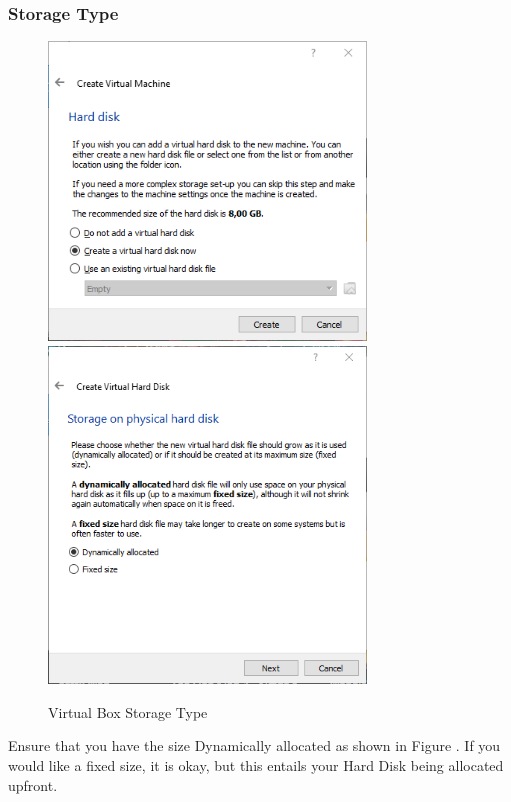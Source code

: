 \subsubsection{Storage Type}
\begin{figure}[!htb]
    \centering
    \includegraphics[width=0.752\textwidth]{images/Win00-03.png}\\[0cm] 
    \includegraphics[width=0.752\textwidth]{images/Win00-05.png}\\[0cm]   
    \caption[Windows Virtual Box]{Virtual Box Storage Type}
    \label{fig:00-05 - Windows Virtual Box Storage Type} 
\end{figure}
Ensure that you have the size Dynamically allocated as shown in Figure .
If you would like a fixed size, it is okay, but this entails your Hard Disk
being allocated upfront.

